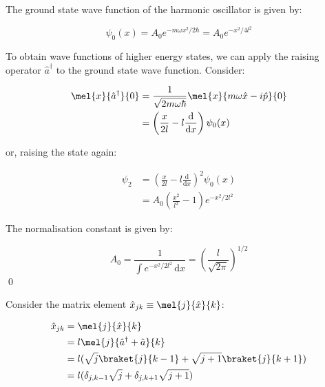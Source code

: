 \documentclass[12pt]{article}
\begin{document}
The ground state wave function of the harmonic oscillator is given by:

\begin{equation}
    \psi_{0}(x) = A_{0} e^{-m\omega x^{2}/2\hbar} = A_{0} e^{-x^{2}/4l^{2}}
\end{equation}

To obtain wave functions of higher energy states, we can apply the raising operator $\hat{a}^{\dagger}$ to the ground state wave function. Consider:

\begin{equation}
    \begin{split}
        \mel{x}{\hat{a}^{\dagger}}{0} &= \frac{1}{\sqrt{2m\omega \hbar}} \mel{x}{m\omega \hat{x} - i \hat{p}}{0} \\
        &= \left( \frac{x}{2l} - l \frac{\mathrm{d}}{\mathrm{d}x} \right) \psi_{0}(x)
    \end{split}
\end{equation}

or, raising the state again:

\begin{equation}
    \begin{split}
        \psi_{2} &= \left( \frac{x}{2l} - l \frac{\mathrm{d}}{\mathrm{d}x} \right)^{2} \psi_{0}(x) \\
        &= A_{0} \left( \frac{x^{2}}{l^{2}} - 1 \right) e^{-x^{2}/2l^{2}}
    \end{split}
\end{equation}

The normalisation constant is given by:

\begin{equation}
    A_{0} = \frac{1}{\int e^{-x^{2}/2l^{2}} \, \mathrm{d}x} = \left( \frac{l}{\sqrt{2\pi}} \right)^{1/2}
\end{equation}
\qed


Consider the matrix element $\hat{x}_{jk} \equiv \mel{j}{\hat{x}}{k}$:

\begin{equation}
    \begin{split}
        \hat{x}_{jk} &= \mel{j}{\hat{x}}{k} \\
        &= l \mel{j}{\hat{a}^{\dagger} + \hat{a}}{k} \\
        &= l (\sqrt{j}\braket{j}{k - 1} + \sqrt{j + 1} \braket{j}{k + 1}) \\
        &= l (\delta_{j, k - 1} \sqrt{j} + \delta_{j, k + 1} \sqrt{j + 1})
    \end{split}
\end{equation}
\end{document}
